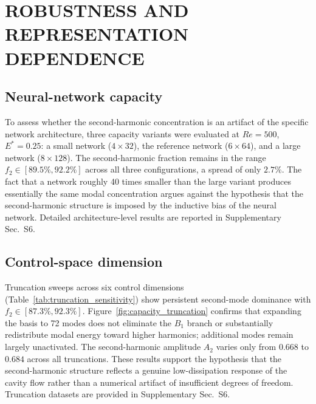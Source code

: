 \documentclass[a4paper,11pt]{article}
\begin{document}
\section{ROBUSTNESS AND REPRESENTATION DEPENDENCE}
\label{sec:robustness}

\subsection{Neural-network capacity}

To assess whether the second-harmonic concentration is an artifact of the specific
network architecture, three capacity variants were evaluated at \(Re=500\),
\(E^*=0.25\): a small network (\(4\times32\)), the reference network
(\(6\times64\)), and a large network (\(8\times128\)). The second-harmonic fraction
remains in the range \(f_2\in[89.5\%,92.2\%]\) across all three configurations,
a spread of only \(2.7\%\). The fact that a network roughly 40 times smaller than
the large variant produces essentially the same modal concentration argues against
the hypothesis that the second-harmonic structure is imposed by the inductive bias
of the neural network. Detailed architecture-level results are reported in
Supplementary Sec.~S6.

\subsection{Control-space dimension}

Truncation sweeps across six control dimensions (Table~\ref{tab:truncation_sensitivity})
show persistent second-mode dominance with \(f_2\in[87.3\%,92.3\%]\).
Figure~\ref{fig:capacity_truncation} confirms that expanding the basis to 72 modes
does not eliminate the \(B_1\) branch or substantially redistribute modal energy
toward higher harmonics; additional modes remain largely unactivated. The
second-harmonic amplitude \(A_2\) varies only from \(0.668\) to \(0.684\) across
all truncations. These results support the hypothesis that the second-harmonic
structure reflects a genuine low-dissipation response of the cavity flow rather
than a numerical artifact of insufficient degrees of freedom. Truncation datasets
are provided in Supplementary Sec.~S6.
\end{document}
